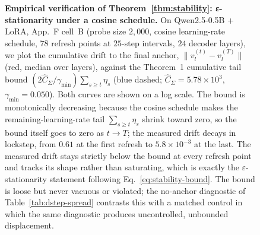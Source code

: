 \begin{figure}[t]
{%
}
\caption{\textbf{Empirical verification of
Theorem~\ref{thm:stability}: ε-stationarity under a cosine
schedule.} On Qwen2.5-0.5B + LoRA, App.~F cell~B (probe size
$2{,}000$, cosine learning-rate schedule, $78$ refresh points at
$25$-step intervals, $24$ decoder layers), we plot the cumulative
drift to the final anchor,
$\|v_l^{(t)} - v_l^{(T)}\|$ (red, median over layers), against the
Theorem~1 cumulative tail bound
$(2\hat{C}_\Sigma / \gamma_{\min}) \sum_{s\ge t}\eta_s$
(blue dashed; $\hat{C}_\Sigma = 5.78\times 10^{3}$,
$\gamma_{\min} = 0.050$). Both curves are shown on a log scale.
The bound is monotonically decreasing because the cosine schedule
makes the remaining-learning-rate tail $\sum_{s\ge t}\eta_s$ shrink
toward zero, so the bound itself goes to zero as $t \to T$; the
measured drift decays in lockstep, from $0.61$ at the first
refresh to $5.8\times 10^{-3}$ at the last. The measured drift
stays strictly below the bound at every refresh point and tracks
its shape rather than saturating, which is exactly the
$\varepsilon$-stationarity statement following
Eq.~\ref{eq:stability-bound}. The bound is loose but never vacuous
or violated; the no-anchor diagnostic of
Table~\ref{tab:dstep-spread} contrasts this with a matched control
in which the same diagnostic produces uncontrolled, unbounded
displacement.}
\label{fig:thm-main}
\end{figure}

